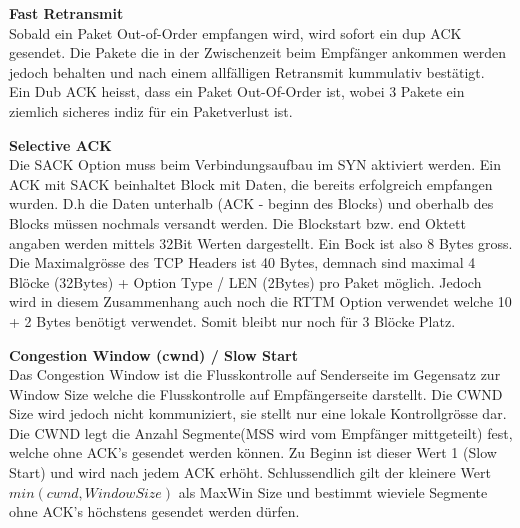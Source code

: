 \textbf{Fast Retransmit}\\
Sobald ein Paket Out-of-Order empfangen wird, wird sofort ein dup ACK gesendet. Die Pakete die in der Zwischenzeit beim Empfänger ankommen werden jedoch behalten und nach einem allfälligen Retransmit kummulativ bestätigt.\\
Ein Dub ACK heisst, dass ein Paket Out-Of-Order ist, wobei 3 Pakete ein ziemlich sicheres indiz für ein Paketverlust ist.

\textbf{Selective ACK}\\
Die SACK Option muss beim Verbindungsaufbau im SYN aktiviert werden. 
Ein ACK mit SACK beinhaltet Block mit Daten, die bereits erfolgreich empfangen wurden. D.h die Daten unterhalb (ACK - beginn des Blocks) und oberhalb des Blocks müssen nochmals versandt werden. Die Blockstart bzw. end Oktett angaben werden mittels 32Bit Werten dargestellt. Ein Bock ist also 8 Bytes gross.
Die Maximalgrösse des TCP Headers ist 40 Bytes, demnach sind maximal 4 Blöcke (32Bytes) + Option Type / LEN (2Bytes) pro Paket möglich. Jedoch wird in diesem Zusammenhang auch noch die RTTM Option verwendet welche 10 + 2 Bytes benötigt verwendet. Somit bleibt nur noch für 3 Blöcke Platz.

\textbf{Congestion Window (cwnd) / Slow Start}\\
Das Congestion Window ist die Flusskontrolle auf Senderseite im Gegensatz zur Window Size welche die Flusskontrolle auf Empfängerseite darstellt. Die CWND Size wird jedoch nicht kommuniziert, sie stellt nur eine lokale Kontrollgrösse dar. Die CWND legt die Anzahl Segmente(MSS wird vom Empfänger mittgeteilt) fest, welche ohne ACK's gesendet werden können. Zu Beginn ist dieser Wert 1 (Slow Start) und wird nach jedem ACK erhöht. Schlussendlich gilt der kleinere Wert $min(cwnd,WindowSize)$ als MaxWin Size und bestimmt wieviele Segmente ohne ACK's höchstens gesendet werden dürfen.

